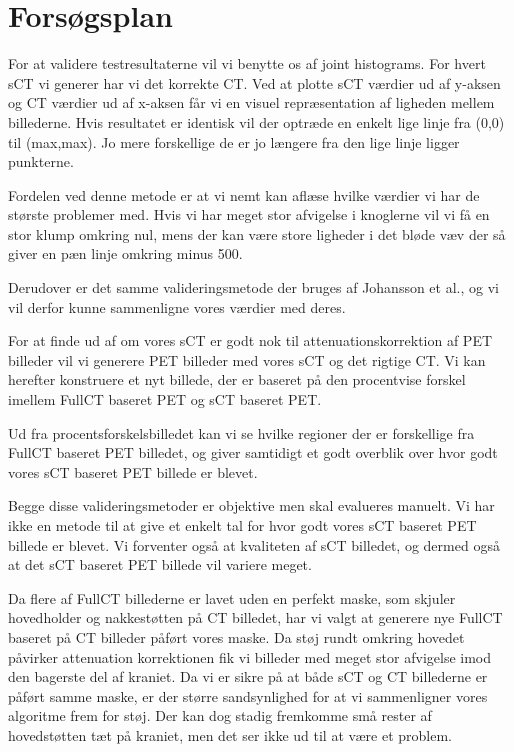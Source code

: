 \section{Forsøgsplan}

For at validere testresultaterne vil vi benytte os af joint histograms. For hvert sCT vi generer har vi det korrekte CT. Ved at plotte sCT værdier ud af y-aksen og CT værdier ud af x-aksen får vi en visuel repræsentation af ligheden mellem billederne. Hvis resultatet er identisk vil der optræde en enkelt lige linje fra (0,0) til (max,max). Jo mere forskellige de er jo længere fra den lige linje ligger punkterne.

Fordelen ved denne metode er at vi nemt kan aflæse hvilke værdier vi har de største problemer med. Hvis vi har meget stor afvigelse i knoglerne vil vi få en stor klump omkring nul, mens der kan være store ligheder i det bløde væv der så giver en pæn linje omkring minus 500.

Derudover er det samme valideringsmetode der bruges af Johansson et al., og vi vil derfor kunne sammenligne vores værdier med deres.

For at finde ud af om vores sCT er godt nok til attenuationskorrektion af PET billeder vil vi generere PET billeder med vores sCT og det rigtige CT. Vi kan herefter konstruere et nyt billede, der er baseret på den procentvise forskel imellem FullCT baseret PET og sCT baseret PET. 

Ud fra procentsforskelsbilledet kan vi se hvilke regioner der er forskellige fra FullCT baseret PET billedet, og giver samtidigt et godt overblik over hvor godt vores sCT baseret PET billede er blevet.

Begge disse valideringsmetoder er objektive men skal evalueres manuelt. Vi har ikke en metode til at give et enkelt tal for hvor godt vores sCT baseret PET billede er blevet. Vi forventer også at kvaliteten af sCT billedet, og dermed også at det sCT baseret PET billede vil variere meget.


Da flere af FullCT billederne er lavet uden en perfekt maske, som skjuler hovedholder og nakkestøtten på CT billedet, har vi valgt at generere nye FullCT baseret på CT billeder påført vores maske. Da støj rundt omkring hovedet påvirker attenuation korrektionen fik vi billeder med meget stor afvigelse imod den bagerste del af kraniet. Da vi er sikre på at både sCT og CT billederne er påført samme maske, er der større sandsynlighed for at vi sammenligner vores algoritme frem for støj. Der kan dog stadig fremkomme små rester af hovedstøtten tæt på kraniet, men det ser ikke ud til at være et problem.

